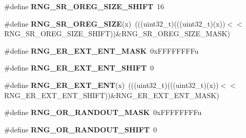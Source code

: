 \begin{DoxyCompactItemize}
\item 
\#define {\bfseries R\+N\+G\+\_\+\+S\+R\+\_\+\+O\+R\+E\+G\+\_\+\+S\+I\+Z\+E\+\_\+\+S\+H\+I\+FT}~16\hypertarget{group__RNG__Register__Masks_ga7bd0f51640dd8184fdc95b687473e7d6}{}\label{group__RNG__Register__Masks_ga7bd0f51640dd8184fdc95b687473e7d6}

\item 
\#define {\bfseries R\+N\+G\+\_\+\+S\+R\+\_\+\+O\+R\+E\+G\+\_\+\+S\+I\+ZE}(x)~(((uint32\+\_\+t)(((uint32\+\_\+t)(x))$<$$<$R\+N\+G\+\_\+\+S\+R\+\_\+\+O\+R\+E\+G\+\_\+\+S\+I\+Z\+E\+\_\+\+S\+H\+I\+FT))\&R\+N\+G\+\_\+\+S\+R\+\_\+\+O\+R\+E\+G\+\_\+\+S\+I\+Z\+E\+\_\+\+M\+A\+SK)\hypertarget{group__RNG__Register__Masks_ga8fe3b65a512da2f37a4a9ae03b4e4f40}{}\label{group__RNG__Register__Masks_ga8fe3b65a512da2f37a4a9ae03b4e4f40}

\item 
\#define {\bfseries R\+N\+G\+\_\+\+E\+R\+\_\+\+E\+X\+T\+\_\+\+E\+N\+T\+\_\+\+M\+A\+SK}~0x\+F\+F\+F\+F\+F\+F\+F\+Fu\hypertarget{group__RNG__Register__Masks_gab27d57cff82acd0615707b3a53c7cce0}{}\label{group__RNG__Register__Masks_gab27d57cff82acd0615707b3a53c7cce0}

\item 
\#define {\bfseries R\+N\+G\+\_\+\+E\+R\+\_\+\+E\+X\+T\+\_\+\+E\+N\+T\+\_\+\+S\+H\+I\+FT}~0\hypertarget{group__RNG__Register__Masks_gae01cc719557411c3218c33e4b855b790}{}\label{group__RNG__Register__Masks_gae01cc719557411c3218c33e4b855b790}

\item 
\#define {\bfseries R\+N\+G\+\_\+\+E\+R\+\_\+\+E\+X\+T\+\_\+\+E\+NT}(x)~(((uint32\+\_\+t)(((uint32\+\_\+t)(x))$<$$<$R\+N\+G\+\_\+\+E\+R\+\_\+\+E\+X\+T\+\_\+\+E\+N\+T\+\_\+\+S\+H\+I\+FT))\&R\+N\+G\+\_\+\+E\+R\+\_\+\+E\+X\+T\+\_\+\+E\+N\+T\+\_\+\+M\+A\+SK)\hypertarget{group__RNG__Register__Masks_ga308a2ffad2128aec4f7883f9f1289940}{}\label{group__RNG__Register__Masks_ga308a2ffad2128aec4f7883f9f1289940}

\item 
\#define {\bfseries R\+N\+G\+\_\+\+O\+R\+\_\+\+R\+A\+N\+D\+O\+U\+T\+\_\+\+M\+A\+SK}~0x\+F\+F\+F\+F\+F\+F\+F\+Fu\hypertarget{group__RNG__Register__Masks_gaa29938490b0cc9d23a54a137c62ba64a}{}\label{group__RNG__Register__Masks_gaa29938490b0cc9d23a54a137c62ba64a}

\item 
\#define {\bfseries R\+N\+G\+\_\+\+O\+R\+\_\+\+R\+A\+N\+D\+O\+U\+T\+\_\+\+S\+H\+I\+FT}~0\hypertarget{group__RNG__Register__Masks_ga3f7e8e180fafb10fbbe34e9dced30b87}{}\label{group__RNG__Register__Masks_ga3f7e8e180fafb10fbbe34e9dced30b87}


\end{DoxyCompactItemize}
